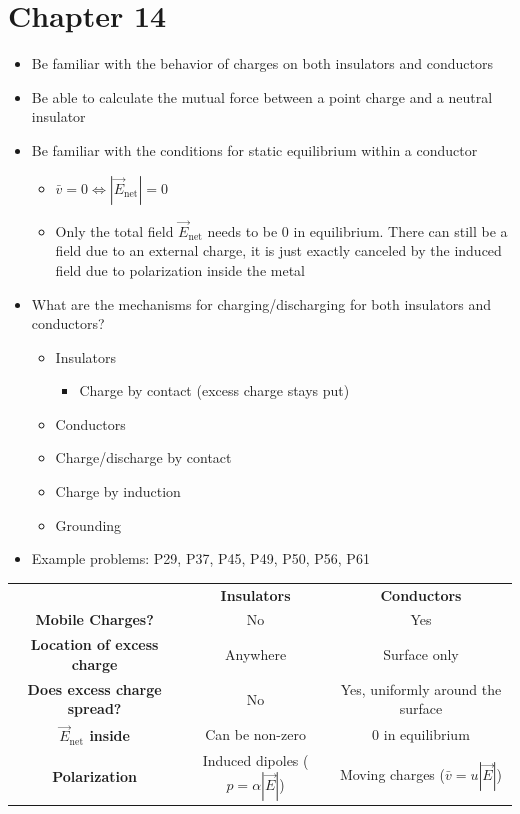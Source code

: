 \documentclass{article}
\begin{document}
\section*{Chapter 14}
\begin{itemize}
	\item Be familiar with the behavior of charges on both insulators and conductors
	\item Be able to calculate the mutual force between a point charge and a neutral insulator
	\item Be familiar with the conditions for static equilibrium within a conductor
	\begin{itemize}
		\item $\bar{v}=0 \Leftrightarrow |\vec{E}_\mathrm{net}|=0$
		\item Only the total field $\vec{E}_\mathrm{net}$ needs to be 0 in equilibrium. There can still be a field due to an external charge, it is just exactly canceled by the induced field due to polarization inside the metal
	\end{itemize}
	\item What are the mechanisms for charging/discharging for both insulators and conductors?
	\begin{itemize}
		\item Insulators
		\begin{itemize}
			\item Charge by contact (excess charge stays put)
		\end{itemize}
		\item Conductors
			\item Charge/discharge by contact
			\item Charge by induction
			\item Grounding
	\end{itemize}
	\item Example problems: P29, P37, P45, P49, P50, P56, P61
\end{itemize}
\begin{table}[ht!]
	\renewcommand{\arraystretch}{2.5}
	\begin{tabular}{ccc}
		&\textbf{Insulators}&\textbf{Conductors}\\
		\textbf{Mobile Charges?}&No&Yes\\
		\textbf{Location of excess charge}&Anywhere&Surface only\\
		\textbf{Does excess charge spread?} & No & Yes, uniformly around the surface\\
		\textbf{$\vec{E}_\mathrm{net}$ inside} & Can be non-zero & 0 in equilibrium\\
		\textbf{Polarization}&Induced dipoles ($p=\alpha|\vec{E}|$)&Moving charges ($\bar{v}=u|\vec{E}|$)
	\end{tabular}
\end{table}
\end{document}

